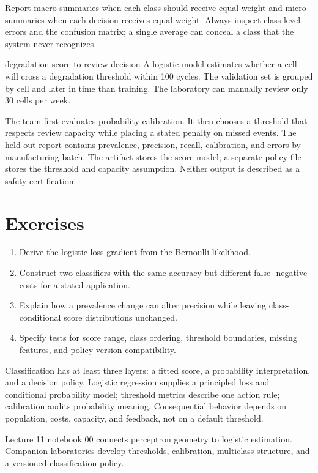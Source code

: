 Report macro summaries when each class should receive equal weight and micro
summaries when each decision receives equal weight. Always inspect class-level
errors and the confusion matrix; a single average can conceal a class that the
system never recognizes.

\begin{workedexample}{degradation score to review decision}
A logistic model estimates whether a cell will cross a degradation threshold
within 100 cycles. The validation set is grouped by cell and later in time than
training. The laboratory can manually review only 30 cells per week.

The team first evaluates probability calibration. It then chooses a threshold
that respects review capacity while placing a stated penalty on missed events.
The held-out report contains prevalence, precision, recall, calibration, and
errors by manufacturing batch. The artifact stores the score model; a separate
policy file stores the threshold and capacity assumption. Neither output is
described as a safety certification.
\end{workedexample}

\section{Exercises}
\begin{enumerate}
  \item Derive the logistic-loss gradient from the Bernoulli likelihood.
  \item Construct two classifiers with the same accuracy but different false-
  negative costs for a stated application.
  \item Explain how a prevalence change can alter precision while leaving class-
  conditional score distributions unchanged.
  \item Specify tests for score range, class ordering, threshold boundaries,
  missing features, and policy-version compatibility.
\end{enumerate}

\begin{chapterreview}
Classification has at least three layers: a fitted score, a probability
interpretation, and a decision policy. Logistic regression supplies a principled
loss and conditional probability model; threshold metrics describe one action
rule; calibration audits probability meaning. Consequential behavior depends on
population, costs, capacity, and feedback, not on a default threshold.
\end{chapterreview}

\begin{notebooklink}
Lecture 11 notebook 00 connects perceptron geometry to logistic estimation.
Companion laboratories develop thresholds, calibration, multiclass structure,
and a versioned classification policy.
\end{notebooklink}
